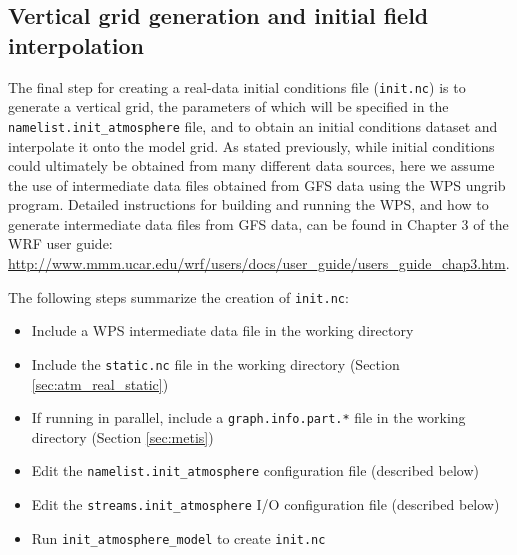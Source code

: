 \subsection{Vertical grid generation and initial field interpolation}
\label{sec:atm_real_met}

The final step for creating a real-data initial conditions file ({\tt init.nc}) is to generate a vertical grid, the parameters of which will be specified in the {\tt namelist.init\_atmosphere} file, and to obtain an initial conditions dataset and interpolate it onto the model grid. As stated previously, while initial conditions could ultimately be obtained from many different data sources, here we assume the use of intermediate data files obtained from GFS data using the WPS ungrib program.  Detailed instructions for building and running the WPS, and how to generate intermediate data files from GFS data, can be found in Chapter 3 of the WRF user guide: \\
\url{http://www.mmm.ucar.edu/wrf/users/docs/user\_guide/users\_guide\_chap3.htm}.

The following steps summarize the creation of {\tt init.nc}:

\begin{itemize}
\item Include a WPS intermediate data file in the working directory
\item Include the {\tt static.nc} file in the working directory (Section \ref{sec:atm_real_static})
\item If running in parallel, include a {\tt graph.info.part.*} file in the working directory (Section \ref{sec:metis})
\item Edit the {\tt namelist.init\_atmosphere} configuration file (described below)
\item Edit the {\tt streams.init\_atmosphere} I/O configuration file (described below)
\item Run {\tt init\_atmosphere\_model} to create {\tt init.nc}
\end{itemize}


